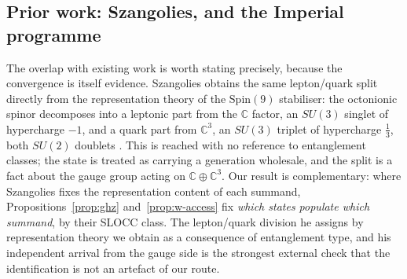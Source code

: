 \subsection{Prior work: Szangolies, and the Imperial programme}
\label{sec:entanglement-szangolies}

The overlap with existing work is worth stating precisely, because the convergence is itself
evidence. Szangolies obtains the same lepton/quark split directly from the representation theory of
the $\mathrm{Spin}(9)$ stabiliser: the octonionic spinor decomposes into a leptonic part from the
$\mathbb{C}$ factor, an $SU(3)$ singlet of hypercharge $-1$, and a quark part from $\mathbb{C}^3$, an
$SU(3)$ triplet of hypercharge $\tfrac13$, both $SU(2)$ doublets \autocite{szangolies2025standardmodel}.
This is reached with no reference to entanglement classes; the state is treated as carrying a
generation wholesale, and the split is a fact about the gauge group acting on
$\mathbb{C}\oplus\mathbb{C}^3$. Our result is complementary: where Szangolies fixes the representation
content of each summand, Propositions~\ref{prop:ghz} and~\ref{prop:w-access} fix \emph{which states
populate which summand}, by their SLOCC class. The lepton/quark division he assigns by representation
theory we obtain as a consequence of entanglement type, and his independent arrival from the gauge
side is the strongest external check that the identification is not an artefact of our route.

